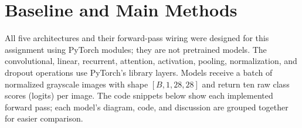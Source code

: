\section{Baseline and Main Methods}

All five architectures and their forward-pass wiring were designed for this assignment using PyTorch modules; they are not pretrained models. The convolutional, linear, recurrent, attention, activation, pooling, normalization, and dropout operations use PyTorch's library layers. Models receive a batch of normalized grayscale images with shape $[B,1,28,28]$ and return ten raw class scores (logits) per image. The code snippets below show each implemented forward pass; each model's diagram, code, and discussion are grouped together for easier comparison.

\begin{table}[H]
    \centering
    \caption{Implemented methods and trainable parameter counts.}
    \label{tab:methods}
\end{table}

